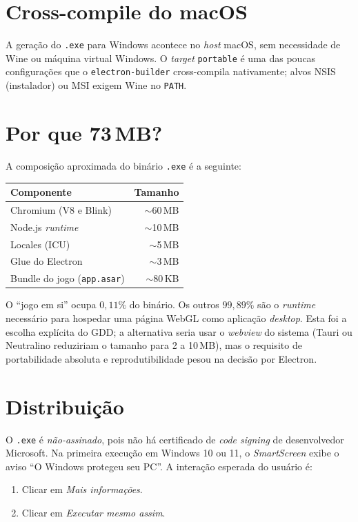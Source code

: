 \section{Cross-compile do macOS}

A geração do \texttt{.exe} para Windows acontece no \emph{host} macOS, sem
necessidade de Wine ou máquina virtual Windows. O \emph{target} \texttt{portable} é
uma das poucas configurações que o \texttt{electron-builder} cross-compila
nativamente; alvos NSIS (instalador) ou MSI exigem Wine no \texttt{PATH}.

\section{Por que 73\,MB?}

A composição aproximada do binário \texttt{.exe} é a seguinte:

\begin{tabular}{lr}
  \toprule
  \textbf{Componente} & \textbf{Tamanho} \\
  \midrule
  Chromium (V8 e Blink) & $\sim$60\,MB \\
  Node.js \emph{runtime} & $\sim$10\,MB \\
  Locales (ICU) & $\sim$5\,MB \\
  Glue do Electron & $\sim$3\,MB \\
  Bundle do jogo (\texttt{app.asar}) & $\sim$80\,KB \\
  \bottomrule
\end{tabular}

O ``jogo em si'' ocupa $0{,}11\%$ do binário. Os outros $99{,}89\%$ são o
\emph{runtime} necessário para hospedar uma página WebGL como aplicação
\emph{desktop}. Esta foi a escolha explícita do GDD; a alternativa seria usar o
\emph{webview} do sistema (Tauri ou Neutralino reduziriam o tamanho para 2 a
10\,MB), mas o requisito de portabilidade absoluta e reprodutibilidade pesou na
decisão por Electron.

\section{Distribuição}

O \texttt{.exe} é \emph{não-assinado}, pois não há certificado de \emph{code
signing} de desenvolvedor Microsoft. Na primeira execução em Windows 10 ou 11, o
\emph{SmartScreen} exibe o aviso ``O Windows protegeu seu PC''. A interação
esperada do usuário é:

\begin{enumerate}
  \item Clicar em \textit{Mais informações}.
  \item Clicar em \textit{Executar mesmo assim}.
\end{enumerate}

